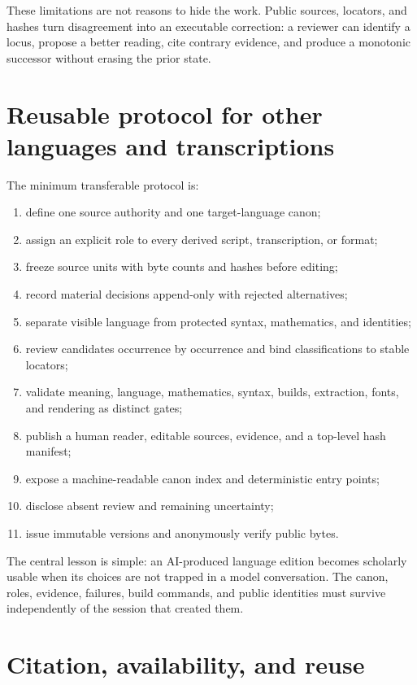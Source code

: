 \documentclass[11pt]{article}
\begin{document}
These limitations are not reasons to hide the work. Public sources, locators, and hashes turn disagreement into an executable correction: a reviewer can identify a locus, propose a better reading, cite contrary evidence, and produce a monotonic successor without erasing the prior state.

\section{Reusable protocol for other languages and transcriptions}

The minimum transferable protocol is:

\begin{enumerate}
\item define one source authority and one target-language canon;
\item assign an explicit role to every derived script, transcription, or format;
\item freeze source units with byte counts and hashes before editing;
\item record material decisions append-only with rejected alternatives;
\item separate visible language from protected syntax, mathematics, and identities;
\item review candidates occurrence by occurrence and bind classifications to stable locators;
\item validate meaning, language, mathematics, syntax, builds, extraction, fonts, and rendering as distinct gates;
\item publish a human reader, editable sources, evidence, and a top-level hash manifest;
\item expose a machine-readable canon index and deterministic entry points;
\item disclose absent review and remaining uncertainty;
\item issue immutable versions and anonymously verify public bytes.
\end{enumerate}

The central lesson is simple: an AI-produced language edition becomes scholarly usable when its choices are not trapped in a model conversation. The canon, roles, evidence, failures, build commands, and public identities must survive independently of the session that created them.

\section*{Citation, availability, and reuse}
\end{document}
